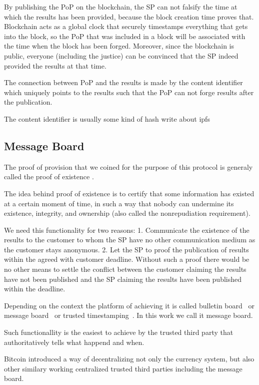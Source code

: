 \documentclass{ieeeaccess}
\begin{document}
By publishing the PoP on the blockchain, the SP can not falsify the time
at which the results has been provided, because the block creation time
proves that. Blockchain acts as a global clock that securely timestamps
everything that gets into the block, so the PoP that was included in a
block will be associated with the time when the block has been forged.
Moreover, since the blockchain is public, everyone (including the
justice) can be convinced that the SP indeed provided the results at
that time.

The connection between PoP and the results is made by the content
identifier which uniquely points to the results such that the PoP can
not forge results after the publication.

The content identifier is usually some kind of hash write about ipfs

\subsection{Message Board}\label{message-board}
The proof of provision that we coined for the purpose of this protocol
is generaly called the proof of existence
\cite{proofofexistence, de2016stampery, Chainpoi39}.

The idea behind proof of existence is to certify that some information
has existed at a certain moment of time, in such a way that nobody can
undermine its existence, integrity, and ownership (also called the
nonrepudiation requirement).

We need this functionality for two reasons: 1. Communicate the existence
of the results to the customer to whom the SP have no other
communication medium as the customer stays anonymous. 2. Let the SP to
proof the publication of results within the agreed with customer
deadline. Without such a proof there would be no other means to settle
the conflict between the customer claiming the results have not been
published and the SP claiming the results have been published within the
deadline.

Depending on the context the platform of achieving it is called bulletin
board~\cite{achenbach2015improved} or message board~\cite{hinarejos2019solution} or trusted timestamping~\cite{gipp2015decentralized}. In this work we call it message board.

Such functionallity is the easiest to achieve by the trusted third party
that authoritatively tells what happend and when.

Bitcoin introduced a way of decentralizing not only the currency system,
but also other similary working centralized trusted third parties
including the message board.
\end{document}
